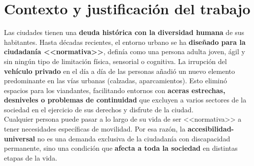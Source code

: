 \section{Contexto y justificación del trabajo}
Las ciudades tienen una \textbf{deuda histórica con la diversidad humana} de sus habitantes. Hasta décadas recientes, el entorno urbano se ha \textbf{diseñado para la ciudadanía <<normativa>>}, definía como una persona adulta joven, ágil y sin ningún tipo de limitación física, sensorial o cognitiva. La irrupción del \textbf{vehículo privado} en el día a día de las personas añadió un nuevo elemento predominante en las vías urbanas (calzadas, aparcamientos). Esto eliminó espacios para los viandantes, facilitando entornos con \textbf{aceras estrechas, desniveles o problemas de continuidad} que excluyen a varios sectores de la sociedad en el ejercicio de sus derechos y disfrute de la ciudad.
\\

Cualquier persona puede pasar a lo largo de su vida de ser <<normativa>> a tener necesidades específicas de movilidad. Por esa razón, la \textbf{\gls{accesibilidad-universal}} no es una demanda exclusiva de la ciudadanía con discapacidad permanente, sino una condición que \textbf{afecta a toda la sociedad} en distintas etapas de la vida.
\\


